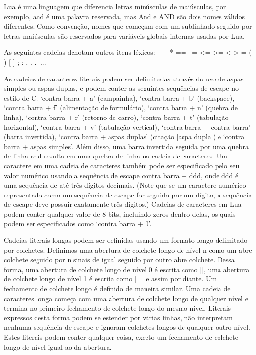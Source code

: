 \documentclass[
12pt, %
openright, %
oneside, %
a4paper, %
english, %
brazil, %
]{abntex2}
\begin{document}
Lua é uma linguagem que diferencia letras minúsculas de maiúsculas, por exemplo, and é uma palavra reservada, mas And e AND são dois nomes válidos diferentes. Como convenção, nomes que começam com um sublinhado seguido por letras maiúsculas são reservados para variáveis globais internas usadas por Lua.

As seguintes cadeias denotam outros itens léxicos:
+ - * == ~= <= >= < > = ( ) { } [ ] ; : , . .. ...

As cadeias de caracteres literais podem ser delimitadas através do uso de aspas simples ou aspas duplas, e podem conter as seguintes sequências de escape no estilo de C: `contra barra + a' (campainha), `contra barra + b' (backspace), `contra barra + f' (alimentação de formulário), `contra barra + n' (quebra de linha), `contra barra + r' (retorno de carro), `contra barra + t' (tabulação horizontal), `contra barra + v' (tabulação vertical), `contra barra + contra barra' (barra invertida), `contra barra + aspas duplas' (citação [aspa dupla]) e `contra barra + aspas simples'. Além disso, uma barra invertida seguida por uma quebra de linha real resulta em uma quebra de linha na cadeia de caracteres. Um caractere em uma cadeia de caracteres também pode ser especificado pelo seu valor numérico usando a sequência de escape contra barra + ddd, onde ddd é uma sequência de até três dígitos decimais. (Note que se um caractere numérico representado como um sequência de escape for seguido por um dígito, a sequência de escape deve possuir exatamente três dígitos.) Cadeias de caracteres em Lua podem conter qualquer valor de 8 bits, incluindo zeros dentro delas, os quais podem ser especificados como `contra barra + 0'.

Cadeias literais longas podem ser definidas usando um formato longo delimitado por colchetes. Definimos uma abertura de colchete longo de nível n como um abre colchete seguido por n sinais de igual seguido por outro abre colchete. Dessa forma, uma abertura de colchete longo de nível 0 é escrita como [[, uma abertura de colchete longo de nível 1 é escrita como [=[ e assim por diante. Um fechamento de colchete longo é definido de maneira similar. Uma cadeia de caracteres longa começa com uma abertura de colchete longo de qualquer nível e termina no primeiro fechamento de colchete longo do mesmo nível. Literais expressos desta forma podem se estender por várias linhas, não interpretam nenhuma sequência de escape e ignoram colchetes longos de qualquer outro nível. Estes literais podem conter qualquer coisa, exceto um fechamento de colchete longo de nível igual ao da abertura.
\end{document}
